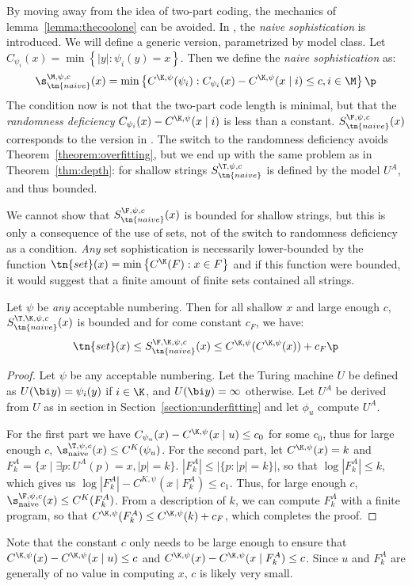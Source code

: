 By moving away from the idea of two-part coding, the mechanics of lemma~\ref{lemma:thecoolone} can be avoided. In \cite{mota2013sophistication}, the \emph{naive sophistication} is introduced. We will define a generic version, parametrized by model class. Let $C_{\psi_i}(x) = \min\left\{|y| : \psi_i(y) = x\right\}$. Then we define the \emph{naive sophistication} as:
\[
\s_\tn{naive}^{\M, \psi, c}(x) = \min\left\{C^{\K, \psi}(\psi_i) : C_{\psi_i}(x) - C^{\K,\psi}(x\mid i) \leq c, i \in \M \right\} \p
\]
\noindent The condition now is not that the two-part code length is minimal, but that the \emph{randomness deficiency} $C_{\psi_i}(x) - C^{\K,\psi}(x\mid i)$ is less than a constant. $S_\tn{naive}^{\F,\psi,c}(x)$ corresponds to the version in \cite{mota2013sophistication}. The switch to the randomness deficiency avoids Theorem~\ref{theorem:overfitting}, but we end up with the same problem as in Theorem~\ref{thm:depth}: for shallow strings $S_\tn{naive}^{\T, \psi, c}$ is defined by the model $U^A$, and thus bounded.

We cannot show that $S_\tn{naive}^{\F, \psi, c}(x)$ is bounded for shallow strings, but this is only a consequence of the use of sets, not of the switch to randomness deficiency as a condition. \emph{Any} set sophistication is necessarily lower-bounded by the function $\tn{set}(x) = \min\left\{C^\K(F) : x \in F\right\}$ and if this function were bounded, it would suggest that a finite amount of finite sets contained all strings.
\begin{theorem}
Let $\psi$ be \emph{any} acceptable numbering. Then for all shallow $x$ and large enough $c$, $S_\tn{naive}^{\T,\K,\psi,c}(x)$ is bounded and for come constant $c_F$, we have:\belowdisplayskip=-12pt
\[
\tn{set}(x) \leq S_\tn{naive}^{\F,\K,\psi,c}(x) \leq C^{\K,\psi}(C^{\K, \psi}(x)) + c_F \p
\]\label{theorem:naive}
\end{theorem}
\begin{proof}
Let $\psi$ be any acceptable numbering. Let the Turing machine $U$ be defined as $U(\bi y) = \psi_i(y)$ if $i \in \K$, and $U(\bi y) = \infty$ otherwise. Let $U^A$ be derived from $U$ as in section in Section~\ref{section:underfitting} and let $\phi_u$ compute $U^A$.

For the first part we have $C_{\psi_u}(x) - C^{\K, \psi}(x\mid u) \leq c_0$ for some $c_0$, thus for large enough $c$, $\s_\text{naive}^{\T,\psi,c}(x) \leq C^K(\psi_u)$. For the second part, let $C^{\K,\psi}(x) = k$ and $F^A_k = \{x \mid \exists p : U^A(p) = x, |p| = k\}$. $|F^A_k| \leq |\{p : |p| = k\}|$, so that $\log |F^A_k| \leq k$, which gives us $\log |F^A_k| - C^{K, \psi}(x \mid F^A_k) \leq c_1$. Thus, for large enough $c$, $\s_\text{naive}^{\F,\psi,c}(x) \leq C^K(F^A_k)$. From a description of $k$, we can compute $F^A_k$ with a finite program, so that $C^{\K,\psi}(F^A_k) \leq C^{\K,\psi}(k) + c_F$, which completes the proof.
\end{proof}
Note that the constant $c$ only needs to be large enough to ensure that $C^{\K,\psi}(x) - C^{\K,\psi}(x\mid u) \leq c$ and $C^{\K,\psi}(x) - C^{\K,\psi}(x\mid F^A_k)\leq c$. Since $u$ and $F^A_k$ are generally of no value in computing $x$, $c$ is likely very small.


